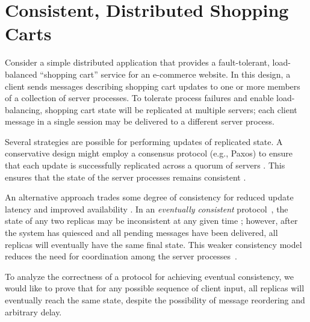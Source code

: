 \section{Consistent, Distributed Shopping Carts}
\label{sec:motivation}

Consider a simple distributed application that provides a fault-tolerant, load-balanced
``shopping cart'' service for an e-commerce website. In this design, a client
sends messages describing shopping cart updates to one or more members of a collection of server
processes. To tolerate process failures and enable load-balancing, shopping cart state will be replicated
at multiple servers; each client message in a single session may be delivered to a different server process.

Several strategies are possible for performing updates of replicated state. A
conservative design might employ a consensus protocol (e.g., Paxos\cite{part-time})
to ensure that each update is successfully replicated across a quorum of servers . This
ensures that the state of the server processes remains consistent .

An alternative approach trades some degree of consistency for reduced update
latency and improved availability . In an \emph{eventually consistent}
protocol~\cite{quicksand,beyond}, the state of any two replicas may be
inconsistent at any given time ; however, after the system has quiesced and all
pending messages have been delivered, all replicas will eventually have the same final
state. This weaker consistency model reduces the need for coordination among the
server processes~\cite{dynamo}.

 
To analyze the correctness of a protocol for achieving eventual consistency, we
would like to prove that for any possible sequence of client input, all
replicas will eventually reach the same state, despite the possibility of
message reordering and arbitrary delay.

